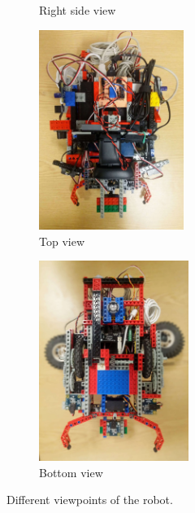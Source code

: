 \begin{figure}[ht]
\begin{subfigure}{0.4\textwidth}
        \caption{Right side view}
    \end{subfigure}
    \begin{subfigure}{0.4\textwidth}
        \includegraphics[width=\linewidth, height=6.5cm]{res/robot-pics/view-top.jpg}
        \caption{Top view}
    \end{subfigure}
    \begin{subfigure}{0.4\textwidth}
        \includegraphics[width=\linewidth, height=6.5cm]{res/robot-pics/view-bottom.jpg}
        \caption{Bottom view}
    \end{subfigure}
    \caption{Different viewpoints of the robot.}
\end{figure}

\newpage


